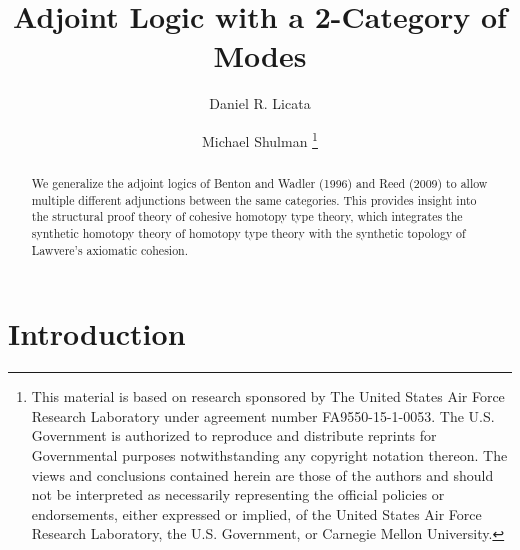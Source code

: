 \documentclass{drl-common/llncs}
\title{Adjoint Logic with a 2-Category of Modes}
\author{Daniel R. Licata\inst{1} \and Michael Shulman\inst{2}
\thanks{
This material is based on research sponsored by The United States Air
Force Research Laboratory under agreement number FA9550-15-1-0053. The
U.S. Government is authorized to reproduce and distribute reprints for
Governmental purposes notwithstanding any copyright notation thereon.
The views and conclusions contained herein are those of the authors and
should not be interpreted as necessarily representing the official
policies or endorsements, either expressed or implied, of the United
States Air Force Research Laboratory, the U.S. Government, or Carnegie
Mellon University.
}}
\institute{Wesleyan University \and University of San Diego}
\begin{document}
\maketitle

\begin{abstract}
We generalize the adjoint logics of Benton and Wadler (1996) and Reed
(2009) to allow multiple different adjunctions between the same
categories.  This provides insight into the structural proof theory of
cohesive homotopy type theory, which integrates the synthetic homotopy
theory of homotopy type theory with the synthetic topology of Lawvere's
axiomatic cohesion.
\end{abstract}

\section{Introduction}
\end{document}
